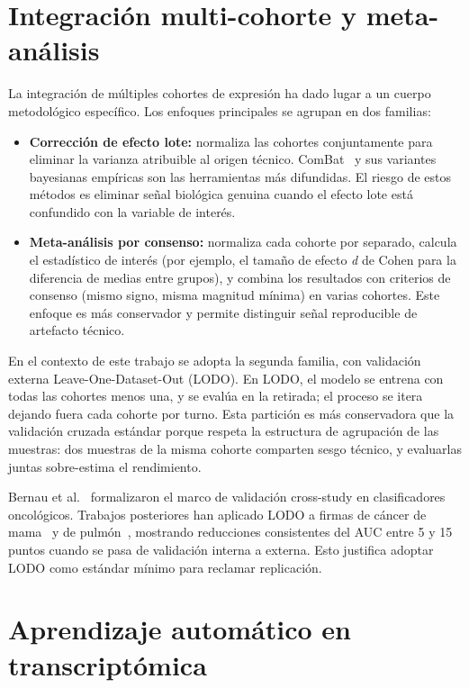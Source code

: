 \section{Integración multi-cohorte y meta-análisis}
\label{sec:metaanalisis}

La integración de múltiples cohortes de expresión ha dado lugar a un cuerpo
metodológico específico. Los enfoques principales se agrupan en dos
familias:

\begin{itemize}
  \item \textbf{Corrección de efecto lote:} normaliza las cohortes
  conjuntamente para eliminar la varianza atribuible al origen técnico.
  ComBat~\cite{johnson2007adjusting} y sus variantes bayesianas empíricas
  son las herramientas más difundidas. El riesgo de estos métodos es
  eliminar señal biológica genuina cuando el efecto lote está confundido
  con la variable de interés.
  \item \textbf{Meta-análisis por consenso:} normaliza cada cohorte por
  separado, calcula el estadístico de interés (por ejemplo, el tamaño de
  efecto \emph{d} de Cohen para la diferencia de medias entre grupos), y
  combina los resultados con criterios de consenso (mismo signo, misma
  magnitud mínima) en varias cohortes. Este enfoque es más conservador y
  permite distinguir señal reproducible de artefacto técnico.
\end{itemize}

En el contexto de este trabajo se adopta la segunda familia, con validación
externa Leave-One-Dataset-Out (LODO). En LODO, el modelo se entrena con
todas las cohortes menos una, y se evalúa en la retirada; el proceso se
itera dejando fuera cada cohorte por turno. Esta partición es más
conservadora que la validación cruzada estándar porque respeta la
estructura de agrupación de las muestras: dos muestras de la misma cohorte
comparten sesgo técnico, y evaluarlas juntas sobre-estima el rendimiento.

Bernau et al.~\cite{bernau2014crossvalidation} formalizaron el marco de
validación cross-study en clasificadores oncológicos. Trabajos posteriores
han aplicado LODO a firmas de cáncer de mama~\cite{waldron2014comparative}
y de pulmón~\cite{shukla2017cross}, mostrando reducciones consistentes del
AUC entre 5 y 15 puntos cuando se pasa de validación interna a externa.
Esto justifica adoptar LODO como estándar mínimo para reclamar
replicación.

\section{Aprendizaje automático en transcriptómica}
\label{sec:ml_estado}

